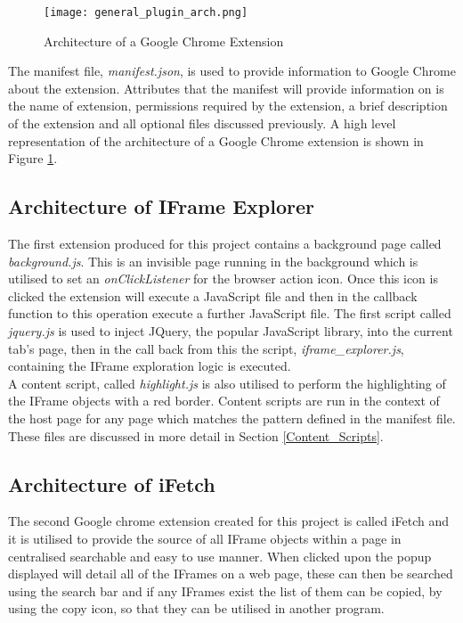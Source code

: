 \documentclass[12pt]{article}
\begin{document}
\begin{figure}[H]
    \centering
    \texttt{[image: general\_plugin\_arch.png]}
    \caption{Architecture of a Google Chrome Extension}
    \label{fig:general_plugin_arch}
\end{figure}

The manifest file, \textit{manifest.json}, is used to provide information to Google Chrome about the extension. Attributes that the manifest will provide information on is the name of extension, permissions required by the extension, a brief description of the extension and all optional files discussed previously. A high level representation of the architecture of a Google Chrome extension is shown in Figure \ref{fig:general_plugin_arch}. 

\subsection{Architecture of IFrame Explorer}
The first extension produced for this project contains a background page called \textit{background.js}. This is an invisible page running in the background which is utilised to set an \textit{onClickListener} for the browser action icon. Once this icon is clicked the extension will execute a JavaScript file and then in the callback function to this operation execute a further JavaScript file. The first script called \textit{jquery.js} is used to inject JQuery, the popular JavaScript library, into the current tab's page, then in the call back from this the script, \textit{iframe\_explorer.js}, containing the IFrame exploration logic is executed. \\

A content script, called \textit{highlight.js} is also utilised to perform the highlighting of the IFrame objects with a red border. Content scripts are run in the context of the host page for any page which matches the pattern defined in the manifest file. These files are discussed in more detail in Section \ref{Content_Scripts}. 

\subsection{Architecture of iFetch}
The second Google chrome extension created for this project is called iFetch and it is utilised to provide the source of all IFrame objects within a page in centralised searchable and easy to use manner. When clicked upon the popup displayed will detail all of the IFrames on a web page, these can then be searched using the search bar and if any IFrames exist the list of them can be copied, by using the copy icon, so that they can be utilised in another program. \\
\end{document}
